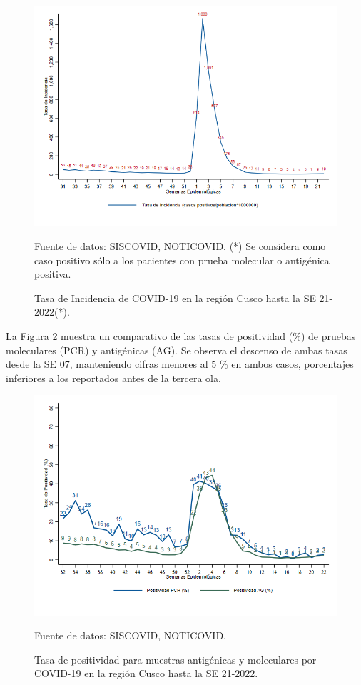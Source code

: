 \documentclass[12pt,a4paper,openany]{book}
\begin{document}
	\begin{figure}[h]
		\caption{Tasa de Incidencia de COVID-19 en la región Cusco hasta la SE 21-2022(*).  }\label{fig:incidencia}
		\begin{center}
			\includegraphics[width=0.90\linewidth]{../figuras/tasa_incidencia_2021_2022.png}
		\end{center}
		{\footnotesize {Fuente de datos: SISCOVID, NOTICOVID. (*) Se considera como caso positivo sólo a los pacientes con prueba molecular o antigénica positiva.}}
	\end{figure}
	
	\pagebreak
	
	
	La Figura \ref{fig:total_muestras_procesada} muestra un comparativo de las tasas de positividad ($\%$) de pruebas moleculares (PCR) y antigénicas (AG). Se observa el descenso de ambas tasas desde la SE 07, manteniendo cifras menores al 5 $\%$ en ambos casos, porcentajes inferiores a los reportados antes de la tercera ola. 
	
	\begin{figure}[h]
		\caption{Tasa de positividad para muestras antigénicas y moleculares por COVID-19 en la región Cusco hasta la SE 21-2022. }\label{fig:total_muestras_procesada}
		\begin{center}
			\includegraphics[width=0.80\linewidth]{../figuras/positividad_diaria_2021_2022.png}
		\end{center}
		{\footnotesize {Fuente de datos: SISCOVID, NOTICOVID.}}
	\end{figure}
	
\end{document}
